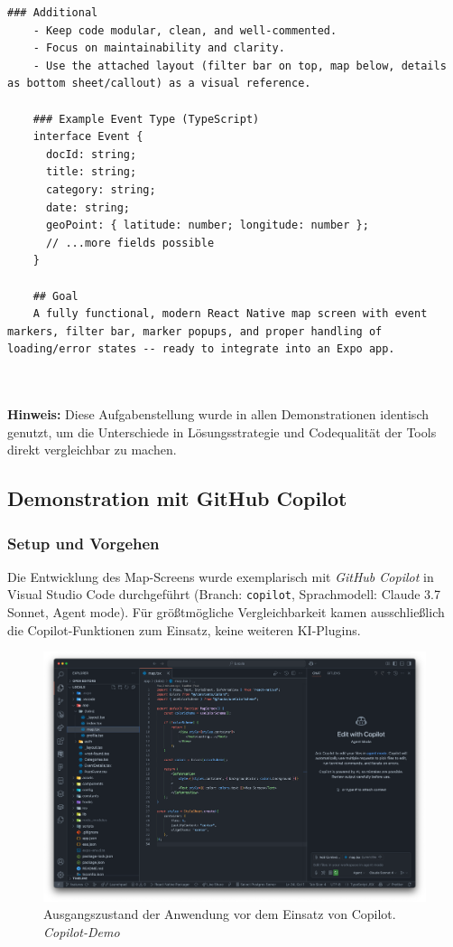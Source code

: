 \begin{lstlisting}[]
    ### Additional
    - Keep code modular, clean, and well-commented.
    - Focus on maintainability and clarity.
    - Use the attached layout (filter bar on top, map below, details as bottom sheet/callout) as a visual reference.
    
    ### Example Event Type (TypeScript)
    interface Event {
      docId: string;
      title: string;
      category: string;
      date: string;
      geoPoint: { latitude: number; longitude: number };
      // ...more fields possible
    }

    ## Goal
    A fully functional, modern React Native map screen with event markers, filter bar, marker popups, and proper handling of loading/error states -- ready to integrate into an Expo app.

    
    \end{lstlisting}

\noindent
\textbf{Hinweis:} Diese Aufgabenstellung wurde in allen Demonstrationen identisch genutzt, um die Unterschiede in Lösungsstrategie und Codequalität der Tools direkt vergleichbar zu machen.

\subsection{Demonstration mit GitHub Copilot}

\subsubsection{Setup und Vorgehen}
Die Entwicklung des Map-Screens wurde exemplarisch mit \textit{GitHub Copilot}
in Visual Studio Code durchgeführt (Branch: \texttt{copilot}, Sprachmodell:
Claude 3.7 Sonnet, Agent mode). Für größtmögliche Vergleichbarkeit kamen
ausschließlich die Copilot-Funktionen zum Einsatz, keine weiteren KI-Plugins.

\begin{figure}[htbp]
      \centering
      \vspace{1em}
      \includegraphics[width=1\textwidth]{images/copilot_screenshots/Screenshots Ist-Zustand-copilot.png}
      \caption{Ausgangszustand der Anwendung vor dem Einsatz von Copilot. \textit{Copilot-Demo}}
      \label{fig:copilot-istzustand}
\end{figure}

